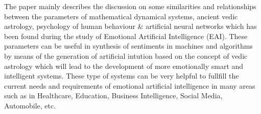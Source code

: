 The paper mainly describes the discussion on some similarities and relationships between the parameters of mathematical dynamical systems, ancient vedic astrology, psychology of human behaviour \& artificial neural networks which has been found during the study of Emotional Artificial Intelligence (EAI). These parameters can be useful in synthesis of sentiments in machines and algorithms by means of the generation of artificial intution based on the concept of vedic astrology which will lead to the development of more emotionally smart and intelligent systems. These type of systems can be very helpful to fullfill the current needs and requirements of emotional artificial intelligence in many areas such as in Healthcare, Education, Business Intelligence, Social Media, Automobile, etc.